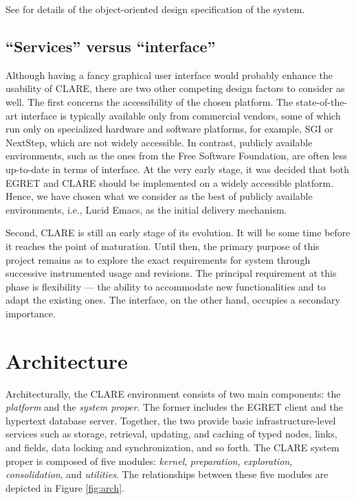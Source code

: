 See \cite{csdl-93-24} for details of the object-oriented design
specification of the system.


\subsection{``Services'' versus ``interface''}
\label{sec:service versus interface}

Although having a fancy graphical user interface would probably enhance the
usability of CLARE, there are two other competing design factors to
consider as well.  The first concerns the accessibility of the chosen
platform.  The state-of-the-art interface is typically available only from
commercial vendors, some of which run only on specialized hardware and
software platforms, for example, SGI or NextStep, which are not widely
accessible.  In contrast, publicly available environments, such as the ones
from the Free Software Foundation, are often less up-to-date in terms of
interface. At the very early stage, it was decided that both EGRET and
CLARE should be implemented on a widely accessible platform. Hence, we have
chosen what we consider as the best of publicly available environments,
i.e., {\sf Lucid Emacs}, as the initial delivery mechanism.

Second, CLARE is still an early stage of its evolution. It will be some
time before it reaches the point of maturation. Until then, the primary
purpose of this project remains as to explore the exact requirements for
system through successive instrumented usage and revisions. The principal
requirement at this phase is flexibility --- the ability to accommodate new
functionalities and to adapt the existing ones. The interface, on the other
hand, occupies a secondary importance.


\section{Architecture}
\label{sec:architecture}

Architecturally, the CLARE environment consists of two main components: the
{\it platform\/} and the {\it system proper\/}. The former includes the
EGRET client and the hypertext database server. Together, the two provide
basic infrastructure-level services such as storage, retrieval, updating,
and caching of typed nodes, links, and fields, data locking and
synchronization, and so forth. The CLARE system proper is composed of five
modules: {\it kernel\/}, {\it preparation\/}, {\it exploration\/}, {\it
consolidation\/}, and {\it utilities\/}. The relationships between these
five modules are depicted in Figure \ref{fig:arch}.

